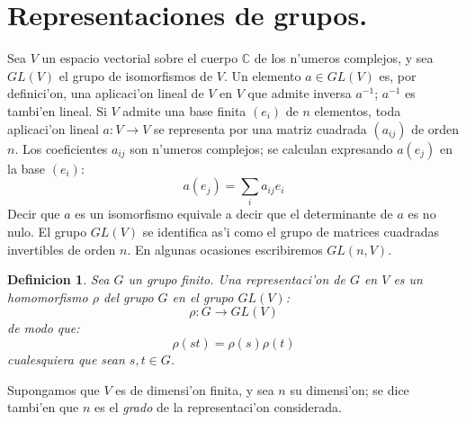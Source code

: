 \documentclass[a4paper,openright,12pt]{book}
\numberwithin{equation}{section} %
\newtheorem{definicion}{Definicion}[section] %
\begin{document}
\section{Representaciones de grupos.}
Sea $V$ un espacio vectorial sobre el cuerpo $\mathbb{C}$ de los n'umeros complejos, y sea $GL(V)$ el grupo de isomorfismos de $V$. Un elemento $a \in GL(V)$ es, por definici'on, una aplicaci'on lineal de $V$ en $V$ que admite inversa $a^{-1}$; $a^{-1}$ es tambi'en lineal. Si $V$ admite una base finita $(e_{i})$ de $n$ elementos, toda aplicaci'on lineal $a:V \rightarrow V$ se representa por una matriz cuadrada $(a_{ij})$ de orden $n$. Los coeficientes $a_{ij}$ son n'umeros complejos; se calculan expresando $a(e_{j})$ en la base $(e_{i})$:
\[
a(e_{j})=\sum_{i} a_{ij}e_{i}
\]
Decir que $a$ es un isomorfismo equivale a decir que el determinante de $a$ es no nulo. El grupo $GL(V)$ se identifica as'i como el grupo de matrices cuadradas invertibles de orden $n$. En algunas ocasiones escribiremos $GL(n,V)$.
\begin{definicion}
Sea $G$ un grupo finito. Una representaci'on de $G$ en $V$ es un homomorfismo $\rho$ del grupo $G$ en el grupo $GL(V)$:
\[
\rho : G \rightarrow GL(V)
\]
de modo que:
\[
\rho (st)=\rho (s)  \rho (t)
\]
cualesquiera que sean $s,t \in G$.
\end{definicion}
Supongamos que $V$ es de dimensi'on finita, y sea $n$ su dimensi'on; se dice tambi'en que $n$ es el \textit{grado} de la representaci'on considerada.
\end{document}
